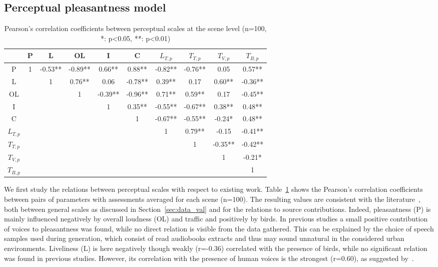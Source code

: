 \documentclass[twocolumn]{article}
\begin{document}
\subsection{Perceptual pleasantness model}
\label{sec:results_perc}

\begin{table}[t]
\centering
\caption{Pearson's correlation coefficients between perceptual scales at the scene level (n=100, *: p<0.05, **: p<0.01)}
\label{tab:percc}
\begin{tabular}{ c | c c c c c c c c c }
\hline
	 & P & L & OL & I & C & $L_{T, p}$ & $T_{T, p}$ & $T_{V, p}$ & $T_{B, p}$ \\ \hline
	P & 1 & -0.53** & -0.89** & 0.66** & 0.88** & -0.82** & -0.76** & 0.05 & 0.57** \\
	L &  & 1 & 0.76** & 0.06 & -0.78** & 0.39** & 0.17 & 0.60** & -0.36** \\
	OL &  &  & 1 & -0.39** & -0.96** & 0.71** & 0.59** & 0.17 & -0.45** \\
	I &  &  &  & 1 & 0.35** & -0.55** & -0.67** & 0.38** & 0.48** \\
	C &  &  &  &  & 1 & -0.67** & -0.55** & -0.24* & 0.48** \\
	$L_{T, p}$ &  &  &  &  &  & 1 & 0.79** & -0.15 & -0.41** \\
	$T_{T, p}$ &  &  &  &  &  &  & 1 & -0.35** & -0.42** \\
	$T_{V, p}$ &  &  &  &  &  &  &  & 1 & -0.21* \\
	$T_{B, p}$ &  &  &  &  &  &  &  &  & 1 \\ \hline
\end{tabular}
\end{table}

We first study the relations between perceptual scales with respect to existing work. Table~\ref{tab:percc} shows the Pearson's correlation coefficients between pairs of parameters with assessments averaged for each scene (n=100). The resulting values are consistent with the literature~\cite{aumond2017, gontier2018}, both between general scales as discussed in Section~\ref{sec:data_val} and for the relations to source contributions. Indeed, pleasantness (P) is mainly influenced negatively by overall loudness (OL) and traffic and positively by birds. In previous studies a small positive contribution of voices to pleasantness was found, while no direct relation is visible from the data gathered. This can be explained by the choice of speech samples used during generation, which consist of read audiobooks extracts and thus may sound unnatural in the considered urban environments. Liveliness (L) is here negatively though weakly (r=-0.36) correlated with the presence of birds, while no significant relation was found in previous studies. However, its correlation with the presence of human voices is the strongest (r=0.60), as suggested by~\cite{axelsson2010}.
\end{document}
